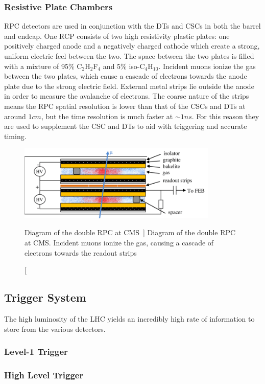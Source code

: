 \subsubsection{Resistive Plate Chambers} \label{sec:CMS_RPC}
RPC detectors are used in conjunction with the DTs and CSCs in both the barrel and endcap. One RCP consists of two high resistivity plastic plates: one positively charged anode and a negatively charged cathode which create a strong, uniform electric feel between the two. The space between the two plates is filled with a mixture of 95\% C$_2$H$_2$F$_4$ and 5\% iso-C$_4$H$_10$. Incident muons ionize the gas between the two plates, which cause a cascade of electrons towards the anode plate due to the strong electric field. External metal strips lie outside the anode in order to measure the avalanche of electrons. The coarse nature of the strips means the RPC spatial resolution is lower than that of the CSCs and DTs at around $1\unit{cm}$, but the time resolution is much faster at $\sim1\unit{ns}$. For this reason they are used to supplement the CSC and DTs to aid with triggering and accurate timing.

\begin{figure}[htpb]
	\centering
	\includegraphics[width=0.85\textwidth]{figs/03_experiment/Design1.png}
	\caption
	[Diagram of the double RPC at CMS~\cite{CMSRPC_HLLHC}]
	{Diagram of the double RPC at CMS. Incident muons ionize the gas, causing a cascade of electrons towards the readout strips~\cite{CMSRPC_HLLHC}}
	\label{fig:RPC}
\end{figure}

\subsection{Trigger System} \label{sec:CMS_trig}
The high luminosity of the LHC yields an incredibly high rate of information to store from the various detectors.

\subsubsection{Level-1 Trigger} \label{sec:CMS_L1T}

\subsubsection{High Level Trigger} \label{sec:CMS_HLT}